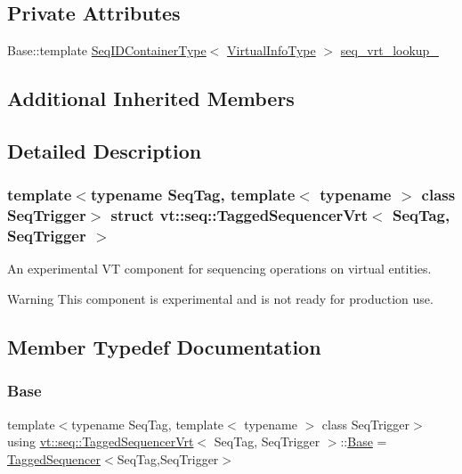 \subsection*{Private Attributes}
\begin{DoxyCompactItemize}
\item 
Base\+::template \hyperlink{structvt_1_1seq_1_1_tagged_sequencer_a718515267468123a9036c30033d74237}{Seq\+I\+D\+Container\+Type}$<$ \hyperlink{structvt_1_1seq_1_1_tagged_sequencer_vrt_a19c5f10f5710fee8cd202735af8aa17f}{Virtual\+Info\+Type} $>$ \hyperlink{structvt_1_1seq_1_1_tagged_sequencer_vrt_a213529bb66256be822694bb39d7cce0f}{seq\+\_\+vrt\+\_\+lookup\+\_\+}
\end{DoxyCompactItemize}
\subsection*{Additional Inherited Members}


\subsection{Detailed Description}
\subsubsection*{template$<$typename Seq\+Tag, template$<$ typename $>$ class Seq\+Trigger$>$\newline
struct vt\+::seq\+::\+Tagged\+Sequencer\+Vrt$<$ Seq\+Tag, Seq\+Trigger $>$}

An experimental VT component for sequencing operations on virtual entities. 

\begin{DoxyWarning}{Warning}
This component is experimental and is not ready for production use. 
\end{DoxyWarning}


\subsection{Member Typedef Documentation}
\mbox{\label{structvt_1_1seq_1_1_tagged_sequencer_vrt_abef9929f24652d9ff758a98e44961263}} 
\subsubsection{\texorpdfstring{Base}{Base}}
{\footnotesize\ttfamily template$<$typename Seq\+Tag, template$<$ typename $>$ class Seq\+Trigger$>$ \\
using \hyperlink{structvt_1_1seq_1_1_tagged_sequencer_vrt}{vt\+::seq\+::\+Tagged\+Sequencer\+Vrt}$<$ Seq\+Tag, Seq\+Trigger $>$\+::\hyperlink{structvt_1_1seq_1_1_tagged_sequencer_vrt_abef9929f24652d9ff758a98e44961263}{Base} =  \hyperlink{structvt_1_1seq_1_1_tagged_sequencer}{Tagged\+Sequencer}$<$Seq\+Tag,Seq\+Trigger$>$}

